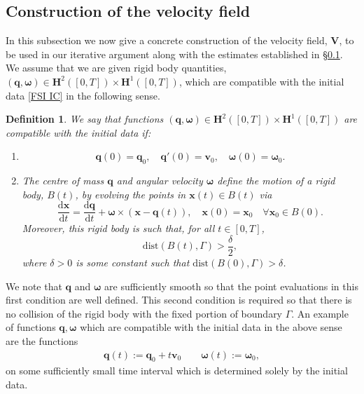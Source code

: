 \documentclass[a4paper]{amsart}
\numberwithin{equation}{section}
\theoremstyle{plain}
\newtheorem{definition}[theorem]{Definition}
\newcommand{\mbf}[1]{\mathbf{#1}}
\begin{document}
\subsection{Construction of the velocity field}
\label{subsection: construction}
In this subsection we now give a concrete construction of the velocity field, $\mbf{V}$, to be used in our iterative argument along with the estimates established in \S\ref{subsection: construction}.
We assume that we are given rigid body quantities,~$(\mbf{q}, \boldsymbol{\omega}) \in \mbf{H}^2([0,T]) \times \mbf{H}^1([0,T])$, which are compatible with the initial data \eqref{FSI IC} in the following sense.
\begin{definition}
    \label{defn: compatible with IC}
    We say that functions $(\mbf{q}, \boldsymbol{\omega}) \in \mbf{H}^2([0,T]) \times \mbf{H}^1([0,T])$ are compatible with the initial data if:
    \begin{enumerate}
        \item \[ \mbf{q}(0) = \mbf{q}_0, \quad \mbf{q}'(0) = \mbf{v}_0, \quad \boldsymbol{\omega}(0)= \boldsymbol{\omega}_0.  \]
        \item The centre of mass $\mbf{q}$ and angular velocity $\boldsymbol{\omega}$ define the motion of a rigid body, $B(t)$, by evolving the points in $\mbf{x}(t) \in B(t)$ via
        \begin{equation}
            \frac{\mathrm{d}\mbf{x}}{\mathrm{d}t} = \frac{\mathrm{d}\mbf{q}}{\mathrm{d}t} + \boldsymbol{\omega} \times (\mbf{x} - \mbf{q}(t)), \quad \mbf{x}(0) = \mbf{x}_0 \quad \forall \mbf{x}_0 \in B(0). \label{eqn: points ODE}
        \end{equation}
        Moreover, this rigid body is such that, for all $t \in [0,T]$,
        \[ \mathrm{dist}(B(t), \Gamma) > \frac{\delta}{2}, \]
        where $\delta > 0$ is some constant such that \(\mathrm{dist}(B(0), \Gamma) > \delta\).
        
    \end{enumerate}
    
\end{definition}
We note that $\mbf{q}$ and $\boldsymbol{\omega}$ are sufficiently smooth so that the point evaluations in this first condition are well defined.
This second condition is required so that there is no collision of the rigid body with the fixed portion of boundary $\Gamma$.
An example of functions $\mbf{q}, \boldsymbol{\omega}$ which are compatible with the initial data in the above sense are the functions
\begin{gather*}
    \mbf{q}(t) := \mbf{q}_0 + t \mbf{v}_0 \qquad \boldsymbol{\omega}(t) := \boldsymbol{\omega}_0,
\end{gather*}
on some sufficiently small time interval which is determined solely by the initial data.
\end{document}
